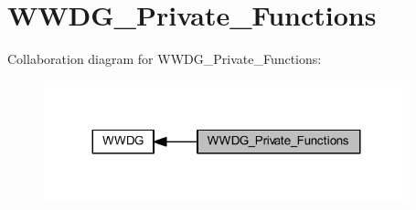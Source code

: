 \hypertarget{group___w_w_d_g___private___functions}{}\section{W\+W\+D\+G\+\_\+\+Private\+\_\+\+Functions}
\label{group___w_w_d_g___private___functions}
Collaboration diagram for W\+W\+D\+G\+\_\+\+Private\+\_\+\+Functions\+:
\nopagebreak
\begin{figure}[H]
\begin{center}
\leavevmode
\includegraphics[width=299pt]{group___w_w_d_g___private___functions}
\end{center}
\end{figure}

